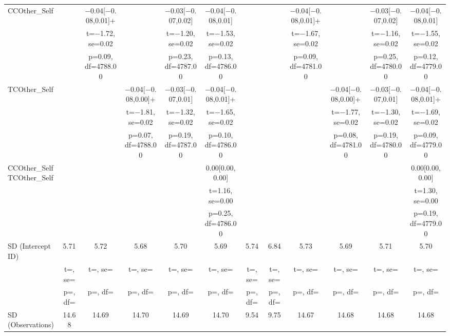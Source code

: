 \documentclass[]{report}
\begin{document}
\begin{table}
{\begin{tabular}[t]{lccccccccccc}
		CCOther\_Self &  & \num{-0.04}[\num{-0.08},\num{0.01}]+ &  & \num{-0.03}[\num{-0.07},\num{0.02}] & \num{-0.04}[\num{-0.08},\num{0.01}] &  &  & \num{-0.04}[\num{-0.08},\num{0.01}]+ &  & \num{-0.03}[\num{-0.07},\num{0.02}] & \num{-0.04}[\num{-0.08},\num{0.01}]\\
		&  & t=\num{-1.72}, se=\num{0.02} &  & t=\num{-1.20}, se=\num{0.02} & t=\num{-1.53}, se=\num{0.02} &  &  & t=\num{-1.67}, se=\num{0.02} &  & t=\num{-1.16}, se=\num{0.02} & t=\num{-1.55}, se=\num{0.02}\\
		&  & p=\num{0.09}, df=\num{4788.00} &  & p=\num{0.23}, df=\num{4787.00} & p=\num{0.13}, df=\num{4786.00} &  &  & p=\num{0.09}, df=\num{4781.00} &  & p=\num{0.25}, df=\num{4780.00} & p=\num{0.12}, df=\num{4779.00}\\
		TCOther\_Self &  &  & \num{-0.04}[\num{-0.08},\num{0.00}]+ & \num{-0.03}[\num{-0.07},\num{0.01}] & \num{-0.04}[\num{-0.08},\num{0.01}]+ &  &  &  & \num{-0.04}[\num{-0.08},\num{0.00}]+ & \num{-0.03}[\num{-0.07},\num{0.01}] & \num{-0.04}[\num{-0.08},\num{0.01}]+\\
		&  &  & t=\num{-1.81}, se=\num{0.02} & t=\num{-1.32}, se=\num{0.02} & t=\num{-1.65}, se=\num{0.02} &  &  &  & t=\num{-1.77}, se=\num{0.02} & t=\num{-1.30}, se=\num{0.02} & t=\num{-1.69}, se=\num{0.02}\\
		&  &  & p=\num{0.07}, df=\num{4788.00} & p=\num{0.19}, df=\num{4787.00} & p=\num{0.10}, df=\num{4786.00} &  &  &  & p=\num{0.08}, df=\num{4781.00} & p=\num{0.19}, df=\num{4780.00} & p=\num{0.09}, df=\num{4779.00}\\
		CCOther\_SelfTCOther\_Self &  &  &  &  & \num{0.00}[\num{0.00},\num{0.00}] &  &  &  &  &  & \num{0.00}[\num{0.00},\num{0.00}]\\
		&  &  &  &  & t=\num{1.16}, se=\num{0.00} &  &  &  &  &  & t=\num{1.30}, se=\num{0.00}\\
		&  &  &  &  & p=\num{0.25}, df=\num{4786.00} &  &  &  &  &  & p=\num{0.19}, df=\num{4779.00}\\
		SD (Intercept ID) & \num{5.71} & \num{5.72} & \num{5.68} & \num{5.70} & \num{5.69} & \num{5.74} & \num{6.84} & \num{5.73} & \num{5.69} & \num{5.71} & \num{5.70}\\
		& t=, se= & t=, se= & t=, se= & t=, se= & t=, se= & t=, se= & t=, se= & t=, se= & t=, se= & t=, se= & t=, \vphantom{1} se=\\
		& p=, df= & p=, df= & p=, df= & p=, df= & p=, df= & p=, df= & p=, df= & p=, df= & p=, df= & p=, df= & p=, \vphantom{1} df=\\
		SD (Observations) & \num{14.68} & \num{14.69} & \num{14.70} & \num{14.69} & \num{14.70} & \num{9.54} & \num{9.75} & \num{14.67} & \num{14.68} & \num{14.68} & \num{14.68}\\

\end{tabular}}
\end{table}
\end{document}
